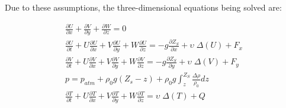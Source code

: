 Due to these assumptions, the three-dimensional equations being solved are:

\begin{subequations}
\label{eq:equa1}
\begin{align}
\frac{\partial U}{\partial x} +\frac{\partial V}{\partial y} +\frac{\partial
W}{\partial z} =0
\\
\frac{\partial U}{\partial t} +U\frac{\partial
U}{\partial x} +V\frac{\partial U}{\partial y} +W\frac{\partial U}{\partial z}
=-g\frac{\partial Z_{S} }{\partial x} +\upsilon \; \Delta \left(U\right)+F_{x}
\\
\frac{\partial V}{\partial t} +U\frac{\partial V}{\partial
x} +V\frac{\partial V}{\partial y} +W\frac{\partial V}{\partial z}
=-g\frac{\partial Z_{S} }{\partial y} +\upsilon \; \Delta \left(V\right)+F_{y}
\\
p=p_{atm} +\rho _{0} g\left(Z_{s} -z\right)+\rho _{0} g\int _{z}^{Z_{S}
}\frac{\Delta \rho }{\rho _{0} } dz
\\
\frac{\partial T}{\partial t}
+U\frac{\partial T}{\partial x} +V\frac{\partial T}{\partial y}
+W\frac{\partial T}{\partial z} =\upsilon \; \Delta \left(T\right)+Q
\end{align}
\end{subequations}

